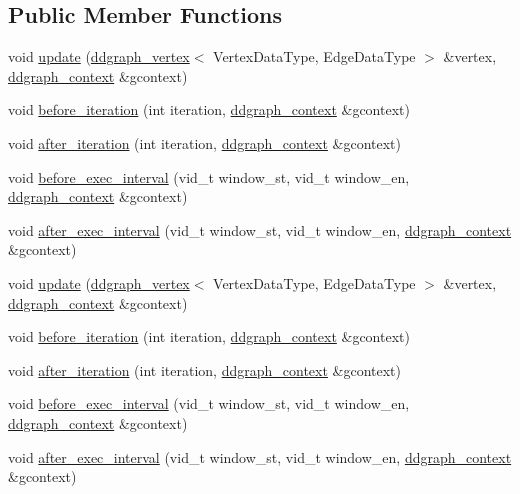 \subsection*{Public Member Functions}
\begin{DoxyCompactItemize}
\item 
void \hyperlink{struct_smoke_test_program_afe153e12ae31476c82214b62417b791b}{update} (\hyperlink{classddgraph_1_1ddgraph__vertex}{ddgraph\-\_\-vertex}$<$ Vertex\-Data\-Type, Edge\-Data\-Type $>$ \&vertex, \hyperlink{structddgraph_1_1ddgraph__context}{ddgraph\-\_\-context} \&gcontext)
\item 
void \hyperlink{struct_smoke_test_program_a955ed7d1dd7ea0f5a12ddaefe299cc4b}{before\-\_\-iteration} (int iteration, \hyperlink{structddgraph_1_1ddgraph__context}{ddgraph\-\_\-context} \&gcontext)
\item 
void \hyperlink{struct_smoke_test_program_a22ced893fb5769579406717abaf1c749}{after\-\_\-iteration} (int iteration, \hyperlink{structddgraph_1_1ddgraph__context}{ddgraph\-\_\-context} \&gcontext)
\item 
void \hyperlink{struct_smoke_test_program_aa99545ae82126af27572baa2c834f737}{before\-\_\-exec\-\_\-interval} (vid\-\_\-t window\-\_\-st, vid\-\_\-t window\-\_\-en, \hyperlink{structddgraph_1_1ddgraph__context}{ddgraph\-\_\-context} \&gcontext)
\item 
void \hyperlink{struct_smoke_test_program_ad2d4d576e0b10dc2b0e09ca6c54f625a}{after\-\_\-exec\-\_\-interval} (vid\-\_\-t window\-\_\-st, vid\-\_\-t window\-\_\-en, \hyperlink{structddgraph_1_1ddgraph__context}{ddgraph\-\_\-context} \&gcontext)
\item 
void \hyperlink{struct_smoke_test_program_afe153e12ae31476c82214b62417b791b}{update} (\hyperlink{classddgraph_1_1ddgraph__vertex}{ddgraph\-\_\-vertex}$<$ Vertex\-Data\-Type, Edge\-Data\-Type $>$ \&vertex, \hyperlink{structddgraph_1_1ddgraph__context}{ddgraph\-\_\-context} \&gcontext)
\item 
void \hyperlink{struct_smoke_test_program_a955ed7d1dd7ea0f5a12ddaefe299cc4b}{before\-\_\-iteration} (int iteration, \hyperlink{structddgraph_1_1ddgraph__context}{ddgraph\-\_\-context} \&gcontext)
\item 
void \hyperlink{struct_smoke_test_program_a22ced893fb5769579406717abaf1c749}{after\-\_\-iteration} (int iteration, \hyperlink{structddgraph_1_1ddgraph__context}{ddgraph\-\_\-context} \&gcontext)
\item 
void \hyperlink{struct_smoke_test_program_aa99545ae82126af27572baa2c834f737}{before\-\_\-exec\-\_\-interval} (vid\-\_\-t window\-\_\-st, vid\-\_\-t window\-\_\-en, \hyperlink{structddgraph_1_1ddgraph__context}{ddgraph\-\_\-context} \&gcontext)
\item 
void \hyperlink{struct_smoke_test_program_ad2d4d576e0b10dc2b0e09ca6c54f625a}{after\-\_\-exec\-\_\-interval} (vid\-\_\-t window\-\_\-st, vid\-\_\-t window\-\_\-en, \hyperlink{structddgraph_1_1ddgraph__context}{ddgraph\-\_\-context} \&gcontext)
\end{DoxyCompactItemize}
